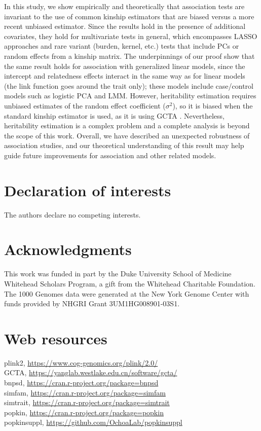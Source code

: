 \documentclass[11pt]{article}
\begin{document}
\begin{linenumbers}
In this study, we show empirically and theoretically that association tests are invariant to the use of common kinship estimators that are biased versus a more recent unbiased estimator.
Since the results hold in the presence of additional covariates, they hold for multivariate tests in general, which encompasses LASSO approaches and rare variant (burden, kernel, etc.) tests that include PCs or random effects from a kinship matrix.
The underpinnings of our proof show that the same result holds for association with generalized linear models, since the intercept and relatedness effects interact in the same way as for linear models (the link function goes around the trait only); these models include case/control models such as logistic PCA and LMM.
However, heritability estimation requires unbiased estimates of the random effect coefficient ($\sigma^2$), so it is biased when the standard kinship estimator is used, as it is using GCTA \citep{yang_gcta:_2011, yang_advantages_2014}.
Nevertheless, heritability estimation is a complex problem and a complete analysis is beyond the scope of this work.
Overall, we have described an unexpected robustness of association studies, and our theoretical understanding of this result may help guide future improvements for association and other related models.



\section*{Declaration of interests}
The authors declare no competing interests.

\section*{Acknowledgments}
This work was funded in part by the Duke University School of Medicine Whitehead Scholars Program, a gift from the Whitehead Charitable Foundation.
The 1000 Genomes data were generated at the New York Genome Center with funds provided by NHGRI Grant 3UM1HG008901-03S1.

\section*{Web resources}
plink2, \url{https://www.cog-genomics.org/plink/2.0/}\\
GCTA, \url{https://yanglab.westlake.edu.cn/software/gcta/}\\
bnpsd, \url{https://cran.r-project.org/package=bnpsd}\\
simfam, \url{https://cran.r-project.org/package=simfam}\\
simtrait, \url{https://cran.r-project.org/package=simtrait}\\
popkin, \url{https://cran.r-project.org/package=popkin}\\
popkinsuppl, \url{https://github.com/OchoaLab/popkinsuppl}


\end{linenumbers}
\end{document}
